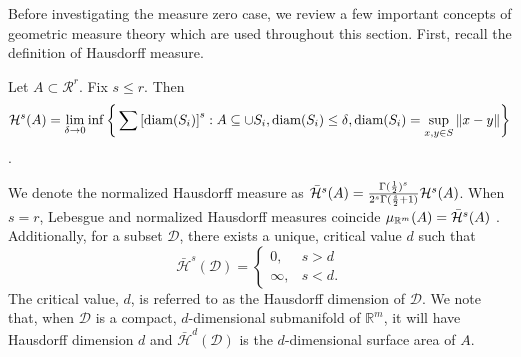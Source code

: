 \documentclass[10pt,fleqn]{article} \pdfoutput=1
\DeclareMathOperator{\1}{\mathbbm{1}} \DeclareMathOperator{\bigO}{\mc O}
\begin{document}
Before investigating the measure zero case, we review a few important concepts of
geometric measure theory which are used throughout this section.  First,
recall the definition of Hausdorff measure.  \begin{Hausdorff_def} Let
	$A\subset\mathcal{R}^r$. Fix $s \le r$. Then $$\mathcal{H}^{s}(A)=
		\underset{\delta\rightarrow 0}\lim \inf \bigg\{ \sum
		\left[{\text{diam}(S_i)}\right]^s: {A\subseteq \cup S_i,
		\text{diam}(S_i)\le \delta}, \text{diam}(S_i)=\sup_{x,y\in
			S}\|x-y\|\bigg\}$$.  \end{Hausdorff_def} We denote the normalized Hausdorff
measure as $\bar{\mathcal{H}}^{s}(A) =\frac{\Gamma(\frac{1}{2})^{s}}{2^s
		\Gamma(\frac{s}{2}+1)} \mathcal{H}^{s}(A)$. When $s=r$, Lebesgue and normalized
Hausdorff measures coincide  $\mu_{\mathbb{R}^m}(A)= \bar{\mathcal{H}}^{s}(A)$
\citep{evans2015measure}.  Additionally, for a subset $\mathcal{D}$, there
exists a unique, critical value $d$ such that
$$\bar{\mathcal{H}}^s(\mathcal{D}) = \begin{cases} 0, & s > d \\ \infty, &
		s < d.\end{cases}$$ The critical value, $d$, is referred to as the
Hausdorff dimension of $\mathcal{D}$. We note that, when $\mathcal{D}$ is a
compact, $d$-dimensional submanifold of $\mathbb{R}^m$, it will have
Hausdorff dimension $d$ and $\bar{\mathcal{H}}^d(\mathcal{D})$ is the
$d$-dimensional surface area of $A.$
\end{document}
